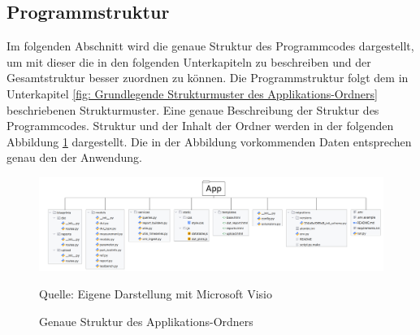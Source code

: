 \subsection{Programmstruktur}
\label{subsec:programmstruktur}


Im folgenden Abschnitt wird die genaue Struktur des Programmcodes dargestellt, um mit dieser die in den folgenden
Unterkapiteln zu beschreiben und der Gesamtstruktur besser zuordnen zu können.
Die Programmstruktur folgt dem in Unterkapitel \ref{fig: Grundlegende Strukturmuster des Applikations-Ordners} beschriebenen Strukturmuster.
Eine genaue Beschreibung der Struktur des Programmcodes.
Struktur und der Inhalt der Ordner werden in der folgenden Abbildung \ref{fig: Genaue Struktur des Applikations-Ordners} dargestellt.
Die in der Abbildung vorkommenden Daten entsprechen genau den der Anwendung.


\begin{figure}[H]
    \centering
    \includegraphics[width=1\textwidth]{Grafiken/Min Ordnerstruktur Projekt.png}
    \caption{Genaue Struktur des Applikations-Ordners}
    \label{fig: Genaue Struktur des Applikations-Ordners}
    {Quelle: Eigene Darstellung mit Microsoft Visio}
\end{figure}